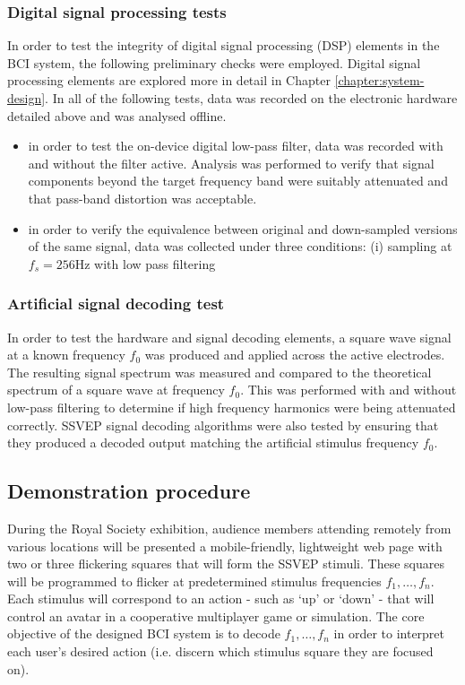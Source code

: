 \subsubsection{Digital signal processing tests}
In order to test the integrity of digital signal processing (DSP) elements in the BCI system, the following preliminary checks were employed. Digital signal processing elements are explored more in detail in Chapter \ref{chapter:system-design}. In all of the following tests, data was recorded on the electronic hardware detailed above and was analysed offline.
\begin{itemize}
    \item in order to test the on-device digital low-pass filter, data was recorded with and without the filter active. Analysis was performed to verify that signal components beyond the target frequency band were suitably attenuated and that pass-band distortion was acceptable. 
    \item in order to verify the equivalence between original and down-sampled versions of the same signal, data was collected under three conditions: (i) sampling at $f_s=256$Hz with low pass filtering 
\end{itemize}

\subsubsection{Artificial signal decoding test}
In order to test the hardware and signal decoding elements, a square wave signal at a known frequency $f_0$ was produced and applied across the active electrodes. The resulting signal spectrum was measured and compared to the theoretical spectrum of a square wave at frequency $f_0$. This was performed with and without low-pass filtering to determine if high frequency harmonics were being attenuated correctly. SSVEP signal decoding algorithms were also tested by ensuring that they produced a decoded output matching the artificial stimulus frequency $f_0$.

\subsection{Demonstration procedure}
During the Royal Society exhibition, audience members attending remotely from various locations will be presented a mobile-friendly, lightweight web page with two or three flickering squares that will form the SSVEP stimuli. These squares will be programmed to flicker at predetermined stimulus frequencies $f_1, \dots, f_n$. Each stimulus will correspond to an action - such as `up' or `down' - that will control an avatar in a cooperative multiplayer game or simulation. The core objective of the designed BCI system is to decode $f_1, \dots, f_n$ in order to interpret each user's desired action (i.e. discern which stimulus square they are focused on).